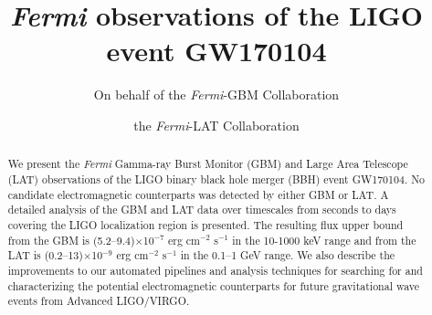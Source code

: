 \documentclass{aastex61}
\begin{document}
\title{\emph{Fermi} observations of the LIGO event GW170104}


\author{On behalf of the \emph{Fermi}-GBM Collaboration}



\author{the \emph{Fermi}-LAT Collaboration}



\begin{abstract}
We present the \emph{Fermi} Gamma-ray Burst Monitor (GBM) and Large Area Telescope (LAT) observations of the LIGO binary black hole merger (BBH) event GW170104.  No candidate electromagnetic counterparts was detected by either GBM or LAT. A detailed analysis of the GBM and LAT data over timescales from seconds to days covering the LIGO localization region is presented. The resulting flux upper bound from the GBM is (5.2--9.4)$\times$10$^{-7}$ erg cm$^{-2}$ s$^{-1}$ in the 10-1000 keV range and from the LAT is (0.2--13)$\times$10$^{-9}$ erg cm$^{-2}$ s$^{-1}$ in the 0.1--1 GeV range. We also describe the improvements to our automated pipelines and analysis techniques for searching for and characterizing the potential electromagnetic counterparts for future gravitational wave events from Advanced LIGO/VIRGO.


\end{abstract}
\end{document}
